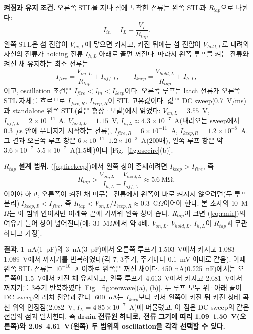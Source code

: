 \documentclass[journal]{IEEEtran}
\begin{document}
\textbf{켜짐과 유지 조건.} 오른쪽 STL을 지나 섬에 도착한 전류는 왼쪽 STL과 $R_{tap}$으로 나뉜다:
\begin{equation}
I_{in}=I_L+\frac{V_I}{R_{tap}}.
\label{eq:kcl}
\end{equation}
왼쪽 STL은 섬 전압이 $V_{on,L}$에 닿으면 켜지고, 켜진 뒤에는 섬 전압이 $V_{hold,L}$로 내려와 자신의 전류가 holding 전류 $I_{h,L}$ 아래로 줄면 꺼진다. 따라서 왼쪽 루프를 켜는 전류와 켜진 채 유지하는 최소 전류는
\begin{equation}
I_{fire}=\frac{V_{on,L}}{R_{tap}}+I_{off,L},\qquad I_{keep}=\frac{V_{hold,L}}{R_{tap}}+I_{h,L},
\label{eq:firekeep}
\end{equation}
이고, oscillation 조건은 $I_{fire}<I_{in}<I_{keep}$이다. 오른쪽 루프는 latch 전류가 오른쪽 STL 자체를 흐르므로 $I_{fire,R}$, $I_{keep,R}$이 STL 고유값이다. 값은 DC sweep(0.7~V/ms)과 standalone 왼쪽 STL(같은 형상·모델)에서 읽었다: $V_{on,L}=3.55$~V, $I_{off,L}=2\times10^{-11}$~A, $V_{hold,L}=1.15$~V, $I_{h,L}\approx4.3\times10^{-7}$~A(내려오는 sweep에서 0.3~$\mu$s 안에 무너지기 시작하는 전류), $I_{fire,R}=6\times10^{-11}$~A, $I_{keep,R}=1.2\times10^{-8}$~A. 그 결과 오른쪽 루프 창은 $6\times10^{-11}$--$1.2\times10^{-8}$~A(200배), 왼쪽 루프 창은 약 $3.6\times10^{-7}$--$5.5\times10^{-7}$~A(1.5배)이다 [Fig.~\ref{fig:osccirc}(b)].

\textbf{$R_{tap}$ 설계 범위.} (\ref{eq:firekeep})에서 왼쪽 창이 존재하려면 $I_{keep}>I_{fire}$, 즉
\begin{equation}
R_{tap}>\frac{V_{on,L}-V_{hold,L}}{I_{h,L}-I_{off,L}}\approx5.6\ \mathrm{M\Omega},
\label{eq:rmin}
\end{equation}
이어야 하고, 오른쪽이 켜진 채 머무는 전류에서 왼쪽이 바로 켜지지 않으려면(두 루프 분리) $I_{keep,R}<I_{fire}$, 즉 $R_{tap}<V_{on,L}/I_{keep,R}\approx0.3$~G$\Omega$이어야 한다. 본 소자의 10~M$\Omega$는 이 범위 안이지만 아래쪽 끝에 가까워 왼쪽 창이 좁다. $R_{tap}$이 크면 (\ref{eq:rmin})의 여유가 늘어 창이 넓어진다(예: 30~M$\Omega$에서 약 4배, $V_{on,L}$, $V_{hold,L}$, $I_{h,L}$이 $R_{tap}$과 무관하다고 가정).

\textbf{결과.} 1~nA(1~pF)와 3~nA(3~pF)에서 오른쪽 루프가 1.503~V에서 켜지고 1.083--1.089~V에서 꺼지기를 반복하였다(각 7, 3주기, 주기마다 0.1~mV 이내로 같음). 이때 왼쪽 STL 전류는 $10^{-10}$~A 이하로 왼쪽은 꺼진 채이다. 450~nA(0.225~nF)에서는 오른쪽이 1.5~V에서 켜진 채 유지되고, 왼쪽 루프가 4.613~V에서 켜지고 2.081~V에서 꺼지기를 3주기 반복하였다 [Fig.~\ref{fig:oscwave}(a), (b)]. 두 루프 모두 위·아래 끝이 DC sweep의 래치 전압과 같다. 600~nA는 $I_{keep}$보다 커서 왼쪽이 켜진 뒤 켜진 상태 곡선 위의 안정점(2.082~V, $I_L=4.85\times10^{-7}$~A)에 머물렀고, 이 점은 DC sweep의 같은 전압의 점과 일치한다. 즉 \textbf{drain 전류원 하나로, 전류 크기에 따라 1.09--1.50~V(오른쪽)와 2.08--4.61~V(왼쪽) 두 범위의 oscillation을 각각 선택할 수 있다.}
\end{document}

